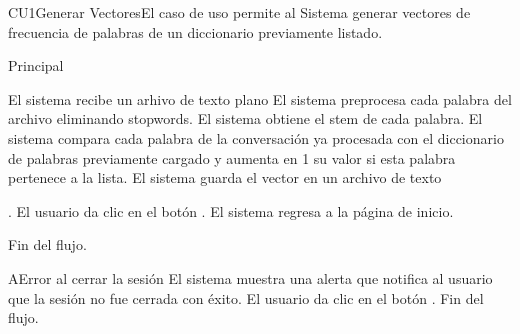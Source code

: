 
% 



	\begin{UseCase}{CU1}{Generar Vectores}{El caso de uso permite al Sistema generar vectores de frecuencia de palabras de un diccionario previamente listado.
	}
	\end{UseCase}

	\begin{UCtrayectoria}{Principal}
	
		\UCpaso El sistema recibe un arhivo de texto plano
		\UCpaso El sistema preprocesa cada palabra del archivo eliminando stopwords.
		\UCpaso El sistema obtiene el stem de cada palabra.
		\UCpaso El sistema compara cada palabra de la conversaci\'on ya procesada con el diccionario de palabras previamente cargado y aumenta en 1 su valor si esta palabra pertenece a la lista.
		\UCpaso  El sistema guarda el vector en un archivo de texto
		
		 .
		\UCpaso[\UCactor] El usuario da clic en el bot\'on .
		\UCpaso  El sistema regresa a la p\'agina de inicio.
	
		\UCpaso[] Fin del flujo.
				
	\end{UCtrayectoria}
		
		\begin{UCtrayectoriaA}{A}{Error al cerrar la sesi\'on}
			\UCpaso El sistema muestra una alerta que notifica al usuario que la sesi\'on no fue cerrada con \'exito.
			\UCpaso[\UCactor] El usuario da clic en el bot\'on . 			
			\UCpaso[] Fin del flujo.
		\end{UCtrayectoriaA}

		
		
				
